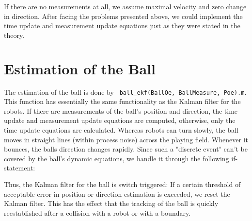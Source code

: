 

If there are no measurements at all, we assume maximal velocity and zero change in direction.
After facing the problems presented above, we could implement the time update and measurement update equations just as they were stated in the theory.

\section{Estimation of the Ball}

The estimation of the ball is done by \texttt{ ball\_ekf(BallOe, BallMeasure, Poe).m}. This function has essentially the same functionality as the Kalman filter for the robots. If there are measurements of the ball's position and direction, the time update and measurement update equations are computed, otherwise, only the time update equations are calculated. Whereas robots can turn slowly, the ball moves in straight lines (within process noise) across the playing field. Whenever it bounces, the balls direction changes rapidly. Since such a "discrete event" can't be covered by the ball's dynamic equations, we handle it through the following if-statement:



Thus, the Kalman filter for the ball is switch triggered: If a certain threshold of acceptable error in position or direction estimation is exceeded, we reset the Kalman filter. This has the effect that the tracking of the ball is quickly reestablished after a collision with a robot or with a boundary.



